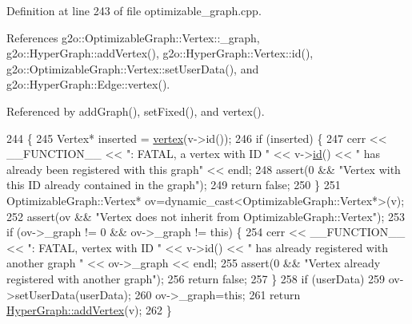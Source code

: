 Definition at line 243 of file optimizable\+\_\+graph.\+cpp.



References g2o\+::\+Optimizable\+Graph\+::\+Vertex\+::\+\_\+graph, g2o\+::\+Hyper\+Graph\+::add\+Vertex(), g2o\+::\+Hyper\+Graph\+::\+Vertex\+::id(), g2o\+::\+Optimizable\+Graph\+::\+Vertex\+::set\+User\+Data(), and g2o\+::\+Hyper\+Graph\+::\+Edge\+::vertex().



Referenced by add\+Graph(), set\+Fixed(), and vertex().


\begin{DoxyCode}
244   \{
245     Vertex* inserted = \hyperlink{structg2o_1_1OptimizableGraph_a19e014e8ec2e9a6e894da8c3a8f8e50d}{vertex}(v->id());
246     \textcolor{keywordflow}{if} (inserted) \{
247       cerr << \_\_FUNCTION\_\_ << \textcolor{stringliteral}{": FATAL, a vertex with ID "} << v->\hyperlink{classg2o_1_1HyperGraph_1_1Vertex_ad76b71c368b71971ac5affb5d57183d3}{id}() << \textcolor{stringliteral}{" has already been registered
       with this graph"} << endl;
248       assert(0 && \textcolor{stringliteral}{"Vertex with this ID already contained in the graph"});
249       \textcolor{keywordflow}{return} \textcolor{keyword}{false};
250     \}
251     OptimizableGraph::Vertex* ov=\textcolor{keyword}{dynamic\_cast<}OptimizableGraph::Vertex*\textcolor{keyword}{>}(v);
252     assert(ov && \textcolor{stringliteral}{"Vertex does not inherit from OptimizableGraph::Vertex"});
253     \textcolor{keywordflow}{if} (ov->\_graph != 0 && ov->\_graph != \textcolor{keyword}{this}) \{
254       cerr << \_\_FUNCTION\_\_ << \textcolor{stringliteral}{": FATAL, vertex with ID "} << v->id() << \textcolor{stringliteral}{" has already registered with
       another graph "} << ov->\_graph << endl;
255       assert(0 && \textcolor{stringliteral}{"Vertex already registered with another graph"});
256       \textcolor{keywordflow}{return} \textcolor{keyword}{false};
257     \}
258     \textcolor{keywordflow}{if} (userData)
259       ov->setUserData(userData);
260     ov->\_graph=\textcolor{keyword}{this};
261     \textcolor{keywordflow}{return} \hyperlink{classg2o_1_1HyperGraph_a7ef87ba3479827b24c6fc29c5fc3aa21}{HyperGraph::addVertex}(v);
262   \}
\end{DoxyCode}

